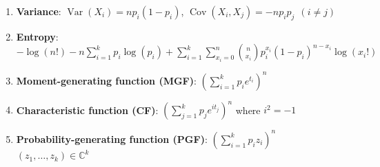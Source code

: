 \begin{enumerate}


    \item \textbf{Variance}:
    $  {\displaystyle \operatorname {Var} (X_{i})=np_{i}(1-p_{i})} $,
    $  {\displaystyle \operatorname {Cov} (X_{i},X_{j})=-np_{i}p_{j}~~(i\neq j)} $
    \hfill \cite{wiki/Multinomial_distribution}




    \item \textbf{Entropy}:
    $  {\displaystyle {-\log(n!)-n\sum _{i=1}^{k}p_{i}\log(p_{i}) +\sum _{i=1}^{k}\sum _{x_{i}=0}^{n}{\binom {n}{x_{i}}}p_{i}^{x_{i}}(1-p_{i})^{n-x_{i}}\log(x_{i}!)}} $
    \hfill \cite{wiki/Multinomial_distribution}

    \item \textbf{Moment-generating function (MGF)}:
    $  {\displaystyle \left(\sum _{i=1}^{k}p_{i}e^{t_{i}}\right)^{n}} $
    \hfill \cite{wiki/Multinomial_distribution}

    \item \textbf{Characteristic function (CF)}:
     ${\displaystyle \left(\sum _{j=1}^{k}p_{j}e^{it_{j}}\right)^{n}}$ where  ${\displaystyle i^{2}=-1}$
    \hfill \cite{wiki/Multinomial_distribution}

    \item \textbf{Probability-generating function (PGF)}:
     ${\displaystyle \left(\sum _{i=1}^{k}p_{i}z_{i}\right)^{n}}$  ${\displaystyle (z_{1},\ldots ,z_{k})\in \mathbb {C} ^{k}}$
    \hfill \cite{wiki/Multinomial_distribution}

\end{enumerate}








